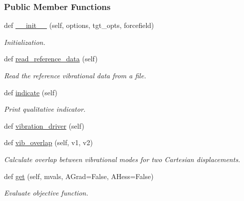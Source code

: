 \subsubsection*{Public Member Functions}
\begin{DoxyCompactItemize}
\item 
def \hyperlink{classsrc_1_1vibration_1_1Vibration_adada8dc93aaa34ec4b07f017808ec7d5}{\+\_\+\+\_\+init\+\_\+\+\_\+} (self, options, tgt\+\_\+opts, forcefield)
\begin{DoxyCompactList}\small\item\em Initialization. \end{DoxyCompactList}\item 
def \hyperlink{classsrc_1_1vibration_1_1Vibration_a3e59c6a1f71154e1beb9c492f9eb753d}{read\+\_\+reference\+\_\+data} (self)
\begin{DoxyCompactList}\small\item\em Read the reference vibrational data from a file. \end{DoxyCompactList}\item 
def \hyperlink{classsrc_1_1vibration_1_1Vibration_a3d6d6f59937c5be9abc1455a9a9ca359}{indicate} (self)
\begin{DoxyCompactList}\small\item\em Print qualitative indicator. \end{DoxyCompactList}\item 
def \hyperlink{classsrc_1_1vibration_1_1Vibration_aa7455f8e79497db19104240d75caec63}{vibration\+\_\+driver} (self)
\item 
def \hyperlink{classsrc_1_1vibration_1_1Vibration_a313f115cc437be87ece62c496ff8b7a5}{vib\+\_\+overlap} (self, v1, v2)
\begin{DoxyCompactList}\small\item\em Calculate overlap between vibrational modes for two Cartesian displacements. \end{DoxyCompactList}\item 
def \hyperlink{classsrc_1_1vibration_1_1Vibration_a362a0f5c538ba08e63234019fdec3057}{get} (self, mvals, A\+Grad=False, A\+Hess=False)
\begin{DoxyCompactList}\small\item\em Evaluate objective function. \end{DoxyCompactList}\end{DoxyCompactItemize}
